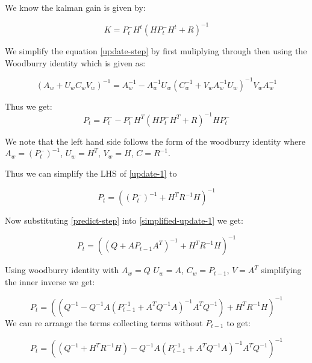 \documentclass{tufte-handout}
\begin{document}
\begin{enumerate}[(a)]
   We know the kalman gain is given by: 
   
   \begin{equation}
       K = P_t^{-}H^{t}(HP^{-}_t H^t + R)^{-1}
   \end{equation}
   
   We simplify the equation \ref{update-step} by first muliplying through then using the Woodburry identity which is given as:
   
   \begin{equation*}
    (A_w + U_wC_wV_w)^{-1} = A_w^{-1} - A_w^{-1}U_w(C_w^{-1} + V_wA_w^{-1}U_w)^{-1} V_wA_w^{-1}
   \end{equation*}

   Thus we get:
   \begin{equation}
        P_t = P_t^{-} -  P_t^{-}H^T(H P^{-}_{t}H^T + R)^{-1}H P_t^{-}
        \label{update-1}
   \end{equation}
   
   We note that the left hand side follows the form of the woodburry identity where $A_w = (P_t^{-})^{-1}$, $U_w = H^T$, $V_w = H$, $C = R^{-1}$.
   
   Thus we can simplify the LHS of \ref{update-1} to 

   \begin{equation}
       P_t = ((P_t^{-})^{-1} +   H^TR^{-1}H)^{-1}
       \label{simplified-update-1}
   \end{equation}

    Now substituting \ref{predict-step}  into \ref{simplified-update-1} we get:
    
    \begin{equation}
       P_t = ((Q + AP_{t-1}A^T)^{-1} + H^TR^{-1}H)^{-1}
    \end{equation}

    Using woodburry identity with $A_w = Q$ $U_w = A$, $C_w = P_{t-1}$, $V = A^T$ simplifying the inner inverse we get:
    
    \begin{equation}
       P_t = \left( (Q^{-1} - Q^{-1}A(P_{t-1}^{-1} + A^TQ^{-1}A)^{-1}A^{T}Q^{-1})+ H^TR^{-1}H \right)^{-1}
    \end{equation}
We can re arrange the terms collecting terms without $P_{t-1}$  to get: 

    \begin{equation}
       P_t = \left( (Q^{-1}  + H^TR^{-1}H)   - Q^{-1}A(P_{t-1}^{-1} + A^TQ^{-1}A)^{-1}A^{T}Q^{-1} \right)^{-1}
    \end{equation}


\end{enumerate}
\end{document}
